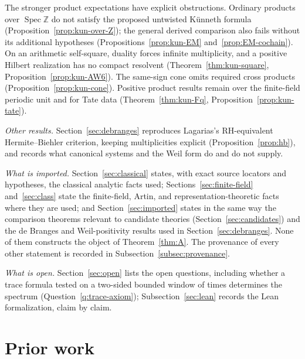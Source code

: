 \documentclass[11pt]{amsart}
\theoremstyle{plain}
\theoremstyle{definition}
\theoremstyle{remark}
\numberwithin{equation}{section}
\newcommand{\Z}{\mathbb{Z}}
\DeclareMathOperator{\Spec}{Spec}
\begin{document}
The stronger product expectations have explicit obstructions. Ordinary
products over $\Spec\Z$ do not satisfy the proposed untwisted
K\"unneth formula (Proposition~\ref{prop:kun-over-Z}); the general
derived comparison also fails without its additional hypotheses
(Propositions~\ref{prop:kun-EM} and~\ref{prop:EM-cochain}). On an
arithmetic self-square, duality forces infinite multiplicity, and a
positive Hilbert realization has no compact resolvent
(Theorem~\ref{thm:kun-square}, Proposition~\ref{prop:kun-AW6}).
The same-sign cone omits required cross products
(Proposition~\ref{prop:kun-cone}). Positive product results remain over
the finite-field periodic unit and for Tate data
(Theorem~\ref{thm:kun-Fq}, Proposition~\ref{prop:kun-tate}).

\emph{Other results.} Section~\ref{sec:debranges} reproduces
Lagarias's RH-equivalent Hermite--Biehler criterion, keeping
multiplicities explicit (Proposition~\ref{prop:hb}), and records what
canonical systems and the Weil form do and do not supply.

\emph{What is imported.} Section~\ref{sec:classical} states, with exact
source locators and hypotheses, the classical analytic facts used;
Sections~\ref{sec:finite-field} and~\ref{sec:class} state the
finite-field, Artin, and representation-theoretic facts where they are
used; and Section~\ref{sec:imported} states in the same way the
comparison theorems relevant to candidate theories
(Section~\ref{sec:candidates}) and the de Branges and Weil-positivity
results used in Section~\ref{sec:debranges}. None of them constructs
the object of Theorem~\ref{thm:A}. The provenance of every other
statement is recorded in Subsection~\ref{subsec:provenance}.

\emph{What is open.} Section~\ref{sec:open} lists the open questions,
including whether a trace formula tested on a two-sided bounded window
of times determines the spectrum (Question~\ref{q:trace-axiom});
Subsection~\ref{sec:lean} records the Lean formalization, claim by
claim.





\section{Prior work}\label{sec:prior}
\end{document}
